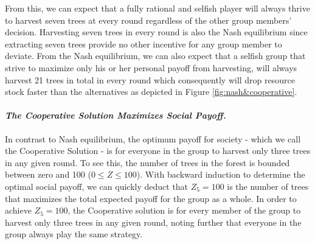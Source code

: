  From this, we can expect that a fully rational and selfish player will always thrive to harvest seven trees at every round regardless of the other group members' decision. Harvesting seven trees in every round is also the Nash equilibrium since extracting seven trees provide no other incentive for any group member to deviate. From the Nash equilibrium, we can also expect that a selfish group that strive to maximize only his or her personal payoff from harvesting, will always harvest 21 trees in total in every round which consequently will drop resource stock faster than the alternatives as depicted in Figure \ref{fig:nash&cooperative}.


\paragraph{\textit{The Cooperative Solution Maximizes Social Payoff.}}
In contrast to Nash equilibrium, the optimum payoff for society - which we call the Cooperative Solution - is for everyone in the group to harvest only three trees in any given round. To see this, the number of trees in the forest is bounded between zero and 100 ($0\leq Z \leq 100$). With backward induction to determine the optimal social payoff, we can quickly deduct that $Z_5=100$ is the number of trees that maximizes the total expected payoff for the group as a whole. In order to achieve $Z_5=100$, the Cooperative solution is for every member of the group to harvest only three trees in any given round, noting further that everyone in the group always play the same strategy.

